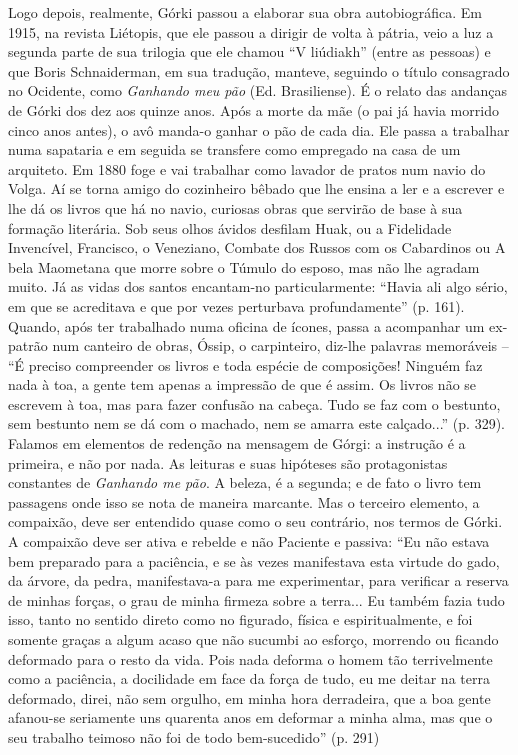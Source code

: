 Logo depois, realmente, Górki passou a elaborar sua obra autobiográfica.
Em 1915, na revista Liétopis, que ele passou a dirigir de volta à
pátria, veio a luz a segunda parte de sua trilogia que ele chamou ``V
liúdiakh'' (entre as pessoas) e que Boris Schnaiderman, em sua tradução,
manteve, seguindo o título consagrado no Ocidente, como \emph{Ganhando
meu pão} (Ed. Brasiliense). É o relato das andanças de Górki dos dez aos
quinze anos. Após a morte da mãe (o pai já havia morrido cinco anos
antes), o avô manda-o ganhar o pão de cada dia. Ele passa a trabalhar
numa sapataria e em seguida se transfere como empregado na casa de um
arquiteto. Em 1880 foge e vai trabalhar como lavador de pratos num navio
do Volga. Aí se torna amigo do cozinheiro bêbado que lhe ensina a ler e
a escrever e lhe dá os livros que há no navio, curiosas obras que
servirão de base à sua formação literária. Sob seus olhos ávidos
desfilam Huak, ou a Fidelidade Invencível, Francisco, o Veneziano,
Combate dos Russos com os Cabardinos ou A bela Maometana que morre sobre
o Túmulo do esposo, mas não lhe agradam muito. Já as vidas dos santos
encantam-no particularmente: ``Havia ali algo sério, em que se
acreditava e que por vezes perturbava profundamente'' (p. 161). Quando,
após ter trabalhado numa oficina de ícones, passa a acompanhar um
ex-patrão num canteiro de obras, Óssip, o carpinteiro, diz-lhe palavras
memoráveis -- ``É preciso compreender os livros e toda espécie de
composições! Ninguém faz nada à toa, a gente tem apenas a impressão de
que é assim. Os livros não se escrevem à toa, mas para fazer confusão na
cabeça. Tudo se faz com o bestunto, sem bestunto nem se dá com o
machado, nem se amarra este calçado...'' (p. 329). Falamos em elementos
de redenção na mensagem de Górgi: a instrução é a primeira, e não por
nada. As leituras e suas hipóteses são protagonistas constantes de
\emph{Ganhando me pão}. A beleza, é a segunda; e de fato o livro tem
passagens onde isso se nota de maneira marcante. Mas o terceiro
elemento, a compaixão, deve ser entendido quase como o seu contrário,
nos termos de Górki. A compaixão deve ser ativa e rebelde e não Paciente
e passiva: ``Eu não estava bem preparado para a paciência, e se às vezes
manifestava esta virtude do gado, da árvore, da pedra, manifestava-a
para me experimentar, para verificar a reserva de minhas forças, o grau
de minha firmeza sobre a terra... Eu também fazia tudo isso, tanto no
sentido direto como no figurado, física e espiritualmente, e foi somente
graças a algum acaso que não sucumbi ao esforço, morrendo ou ficando
deformado para o resto da vida. Pois nada deforma o homem tão
terrivelmente como a paciência, a docilidade em face da força de tudo,
eu me deitar na terra deformado, direi, não sem orgulho, em minha hora
derradeira, que a boa gente afanou-se seriamente uns quarenta anos em
deformar a minha alma, mas que o seu trabalho teimoso não foi de todo
bem-sucedido'' (p. 291)

